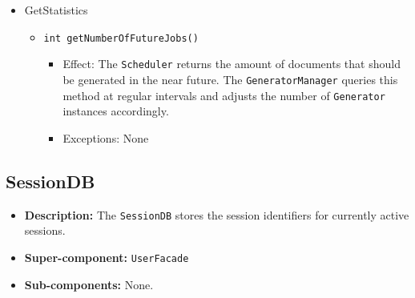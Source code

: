 \documentclass[a4paper,10pt]{article}
\begin{document}
\begin{itemize}
      \item GetStatistics
    \begin{itemize}
        \item \texttt{int getNumberOfFutureJobs()}
        \begin{itemize}
            \item Effect: The \texttt{Scheduler} returns the amount of documents that should be generated in the near future. The \texttt{GeneratorManager} queries this method at regular intervals and adjusts the number of \texttt{Generator} instances accordingly.
            \item Exceptions: None
        \end{itemize}
    \end{itemize}
\end{itemize}

\subsection{SessionDB}
\begin{itemize}
    \item \textbf{Description:} The \texttt{SessionDB} stores the session identifiers for currently active sessions.
    \item \textbf{Super-component:} \texttt{UserFacade}
    \item \textbf{Sub-components:} None.
\end{itemize}
\end{document}
